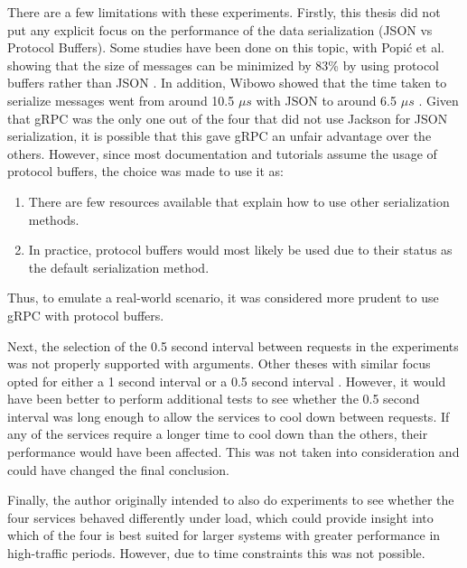 There are a few limitations with these experiments. Firstly, this thesis did not put any explicit focus on the performance of the data serialization (JSON vs Protocol Buffers). Some studies have been done on this topic, with Popić et al. showing that the size of messages can be minimized by 83\% by using protocol buffers rather than JSON \cite{popic2016performance}. In addition, Wibowo showed that the time taken to serialize messages went from around 10.5 \(\mu s\) with JSON to around 6.5 \(\mu s\) \cite{wibowo2011evaluation}. Given that gRPC was the only one out of the four that did not use Jackson for JSON serialization, it is possible that this gave gRPC an unfair advantage over the others. However, since most documentation and tutorials assume the usage of protocol buffers, the choice was made to use it as:
\begin{enumerate}
    \item There are few resources available that explain how to use other serialization methods.
    \item In practice, protocol buffers would most likely be used due to their status as the default serialization method.
\end{enumerate}
Thus, to emulate a real-world scenario, it was considered more prudent to use gRPC with protocol buffers. 

Next, the selection of the 0.5 second interval between requests in the experiments was not properly supported with arguments. Other theses with similar focus opted for either a 1 second interval \cite{johansson2017efficient} or a 0.5 second interval \cite{cederlund2016performance}. However, it would have been better to perform additional tests to see whether the 0.5 second interval was long enough to allow the services to cool down between requests. If any of the services require a longer time to cool down than the others, their performance would have been affected. This was not taken into consideration and could have changed the final conclusion. 

Finally, the author originally intended to also do experiments to see whether the four services behaved differently under load, which could provide insight into which of the four is best suited for larger systems with greater performance in high-traffic periods. However, due to time constraints this was not possible.